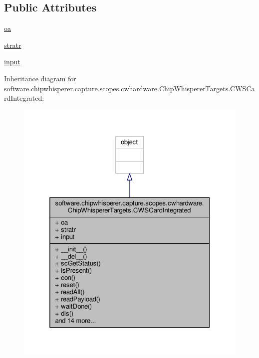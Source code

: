 \subsection*{Public Attributes}
\begin{DoxyCompactItemize}
\item 
\hyperlink{classsoftware_1_1chipwhisperer_1_1capture_1_1scopes_1_1cwhardware_1_1ChipWhispererTargets_1_1CWSCardIntegrated_a4e15c26159aa95c1a3c759087fcd7b17}{oa}
\item 
\hyperlink{classsoftware_1_1chipwhisperer_1_1capture_1_1scopes_1_1cwhardware_1_1ChipWhispererTargets_1_1CWSCardIntegrated_a9ffd14c3d5aa3c00a4e9b67bc2a9097d}{stratr}
\item 
\hyperlink{classsoftware_1_1chipwhisperer_1_1capture_1_1scopes_1_1cwhardware_1_1ChipWhispererTargets_1_1CWSCardIntegrated_af0c9a44dafea1aff3579ccfd1211e41a}{input}
\end{DoxyCompactItemize}


Inheritance diagram for software.\+chipwhisperer.\+capture.\+scopes.\+cwhardware.\+Chip\+Whisperer\+Targets.\+C\+W\+S\+Card\+Integrated\+:\nopagebreak
\begin{figure}[H]
\begin{center}
\leavevmode
\includegraphics[width=325pt]{d9/d98/classsoftware_1_1chipwhisperer_1_1capture_1_1scopes_1_1cwhardware_1_1ChipWhispererTargets_1_1CWSCardIntegrated__inherit__graph}
\end{center}
\end{figure}


